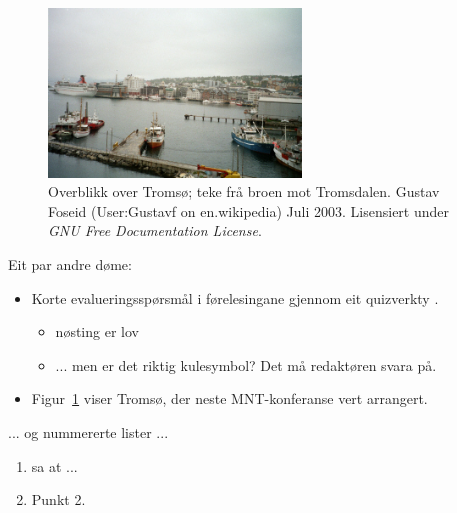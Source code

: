 \documentclass[nynorsk,journal,biblatex]{mnt}
\begin{document}
\begin{figure}
\begin{center}
  \includegraphics[width=0.6\textwidth]{tromso}
\end{center}
  \caption{Overblikk over Tromsø; teke frå broen mot Tromsdalen.
    Gustav Foseid (User:Gustavf on en.wikipedia)
    Juli 2003.
    Lisensiert under \emph{GNU Free Documentation License}.
    }
  \label{fig}
\end{figure}

Eit par andre døme:
\begin{itemize}
  \item 
Korte evalueringsspørsmål i førelesingane gjennom eit
      quizverkty \citep{hgs2018udit}.
   \begin{itemize}
     \item nøsting er lov
     \item ... men er det riktig kulesymbol?  Det må redaktøren svara på.
   \end{itemize}
  \item 
Figur~\ref{fig} viser Tromsø, der neste MNT-konferanse vert arrangert.
\end{itemize}

... og nummererte lister ...
\begin{enumerate}
  \item 
    \citet{biggs11a} sa at ...
  \item Punkt 2.
\end{enumerate}
\end{document}
